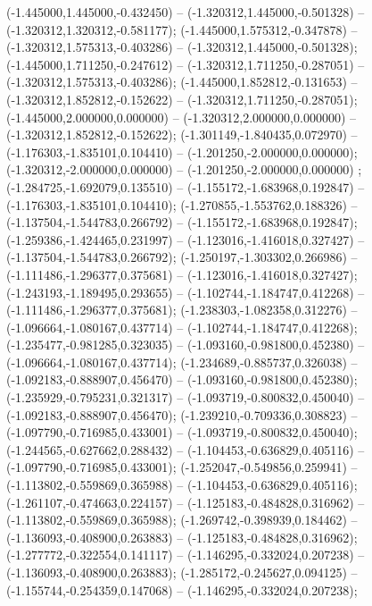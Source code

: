  (-1.445000,1.445000,-0.432450) -- (-1.320312,1.445000,-0.501328) -- (-1.320312,1.320312,-0.581177);
 (-1.445000,1.575312,-0.347878) -- (-1.320312,1.575313,-0.403286) -- (-1.320312,1.445000,-0.501328);
 (-1.445000,1.711250,-0.247612) -- (-1.320312,1.711250,-0.287051) -- (-1.320312,1.575313,-0.403286);
 (-1.445000,1.852812,-0.131653) -- (-1.320312,1.852812,-0.152622) -- (-1.320312,1.711250,-0.287051);
 (-1.445000,2.000000,0.000000) -- (-1.320312,2.000000,0.000000) -- (-1.320312,1.852812,-0.152622);
 (-1.301149,-1.840435,0.072970) -- (-1.176303,-1.835101,0.104410) -- (-1.201250,-2.000000,0.000000);
 (-1.320312,-2.000000,0.000000) -- (-1.201250,-2.000000,0.000000) ;
 (-1.284725,-1.692079,0.135510) -- (-1.155172,-1.683968,0.192847) -- (-1.176303,-1.835101,0.104410);
 (-1.270855,-1.553762,0.188326) -- (-1.137504,-1.544783,0.266792) -- (-1.155172,-1.683968,0.192847);
 (-1.259386,-1.424465,0.231997) -- (-1.123016,-1.416018,0.327427) -- (-1.137504,-1.544783,0.266792);
 (-1.250197,-1.303302,0.266986) -- (-1.111486,-1.296377,0.375681) -- (-1.123016,-1.416018,0.327427);
 (-1.243193,-1.189495,0.293655) -- (-1.102744,-1.184747,0.412268) -- (-1.111486,-1.296377,0.375681);
 (-1.238303,-1.082358,0.312276) -- (-1.096664,-1.080167,0.437714) -- (-1.102744,-1.184747,0.412268);
 (-1.235477,-0.981285,0.323035) -- (-1.093160,-0.981800,0.452380) -- (-1.096664,-1.080167,0.437714);
 (-1.234689,-0.885737,0.326038) -- (-1.092183,-0.888907,0.456470) -- (-1.093160,-0.981800,0.452380);
 (-1.235929,-0.795231,0.321317) -- (-1.093719,-0.800832,0.450040) -- (-1.092183,-0.888907,0.456470);
 (-1.239210,-0.709336,0.308823) -- (-1.097790,-0.716985,0.433001) -- (-1.093719,-0.800832,0.450040);
 (-1.244565,-0.627662,0.288432) -- (-1.104453,-0.636829,0.405116) -- (-1.097790,-0.716985,0.433001);
 (-1.252047,-0.549856,0.259941) -- (-1.113802,-0.559869,0.365988) -- (-1.104453,-0.636829,0.405116);
 (-1.261107,-0.474663,0.224157) -- (-1.125183,-0.484828,0.316962) -- (-1.113802,-0.559869,0.365988);
 (-1.269742,-0.398939,0.184462) -- (-1.136093,-0.408900,0.263883) -- (-1.125183,-0.484828,0.316962);
 (-1.277772,-0.322554,0.141117) -- (-1.146295,-0.332024,0.207238) -- (-1.136093,-0.408900,0.263883);
 (-1.285172,-0.245627,0.094125) -- (-1.155744,-0.254359,0.147068) -- (-1.146295,-0.332024,0.207238);
